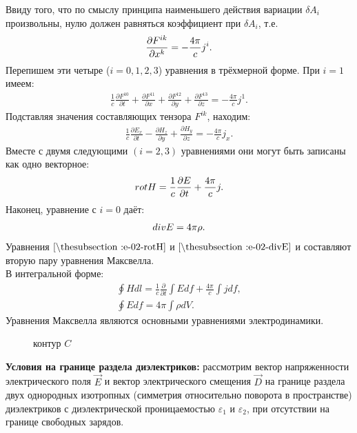 \documentclass[__main__.tex]{subfiles}
\begin{document}
Ввиду того, что по смыслу принципа наименьшего действия вариации $\delta A_i$ произвольны, нулю должен равняться коэффициент при $\delta A_i$, т.е.
\begin{gather}
\llabel{e-02-deltaF}
\frac{\partial F^{ik}}{\partial x^k} = -\frac{4\pi}{c}j^i.
\end{gather}
Перепишем эти четыре ($i = 0, 1, 2, 3$) уравнения в трёхмерной форме. При $i=1$ имеем:
\begin{gather*}
\frac{1}{c}\frac{\partial F^{10}}{\partial t} + \frac{\partial F^{11}}{\partial x} + \frac{\partial F^{12}}{\partial y} + \frac{\partial F^{13}}{\partial z} = -\frac{4\pi}{c}j^1.
\end{gather*}
Подставляя значения составляющих тензора $F^{ik}$, находим:
\begin{gather*}
\frac{1}{c}\frac{\partial E_x}{\partial t} - \frac{\partial H_z}{\partial y} + \frac{\partial H_y}{\partial z} = -\frac{4\pi}{c}j_x.
\end{gather*}
Вместе с двумя следующими $(i = 2, 3)$ уравнениями они могут быть записаны как одно векторное:
\begin{gather}
\llabel{e-02-rotH}
rot H = \frac{1}{c}\frac{\partial E}{\partial t} + \frac{4\pi}{c}j.
\end{gather}
Наконец, уравнение с $i=0$ даёт:
\begin{gather}
\llabel{e-02-divE}
div E = 4\pi\rho.
\end{gather}
Уравнения $\lref{e-02-rotH}$ и $\lref{e-02-divE}$ и составляют вторую пару уравнения Максвелла.\\
В интегральной форме:\\
\begin{gather*}
\oint Hdl = \frac{1}{c}\frac{\partial}{\partial t}\int Edf + \frac{4\pi}{c}\int jdf,\\
\oint Edf = 4\pi\int \rho dV.
\end{gather*}
Уравнения Максвелла являются основными уравнениями электродинамики.\\

\begin{wrapfigure}{r}{.3\linewidth}
	\centering
	\def\svgwidth{1\linewidth}
	
	\caption{контур $C$}
\end{wrapfigure}

\textbf{Условия на границе раздела диэлектриков:} рассмотрим вектор напряженности электрического поля $\vec{E}$ и вектор электрического смещения $\vec{D}$ на границе раздела двух однородных изотропных (симметрия относительно поворота в пространстве) диэлектриков с диэлектрической проницаемостью $\varepsilon_1$ и $\varepsilon_2$, при отсутствии на границе свободных зарядов.
\end{document}
